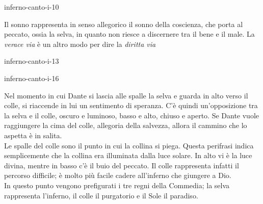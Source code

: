\documentclass[preview]{standalone}
\begin{document}
\begin{snippet}{inferno-canto-i-10}
    
    Il sonno rappresenta in senso allegorico il sonno della coscienza,
    che porta al peccato, ossia la selva, in quanto non riesce a discernere 
    tra il bene e il male.
    La \textit{verace via} è un altro modo per dire la \textit{diritta via}
\end{snippet}


\begin{snippet}{inferno-canto-i-13}

\end{snippet}

\begin{snippet}{inferno-canto-i-16}

    Nel momento in cui Dante si lascia alle spalle la selva e guarda in alto verso il colle,
    si riaccende in lui un sentimento di speranza. C'è quindi un'opposizione tra la selva e il colle, 
    oscuro e luminoso, basso e alto, chiuso e aperto. Se Dante vuole raggiungere la cima del colle, 
    allegoria della salvezza, allora il cammino che lo aspetta è in salita.
    \\
    Le spalle del colle sono il punto in cui la collina si piega.
    Questa perifrasi indica semplicemente che la collina era illuminata dalla luce solare.
    In alto vi è la luce divina, mentre in basso c'è il buio del peccato.
    Il colle rappresenta infatti il percorso difficile; è molto più facile
    cadere all'inferno che giungere a Dio. \\
    In questo punto vengono prefigurati i tre regni della Commedia; la selva rappresenta
    l'inferno, il colle il purgatorio e il Sole il paradiso.
\end{snippet}
\end{document}
